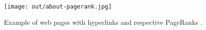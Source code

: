 \begin{figure}[hbtp]
  \centering
  \texttt{[image: out/about-pagerank.jpg]}
  \caption{Example of web pages with hyperlinks and respective PageRanks \cite{pr-jardine07}.}
  \label{fig:about-pagerank}
\end{figure}
